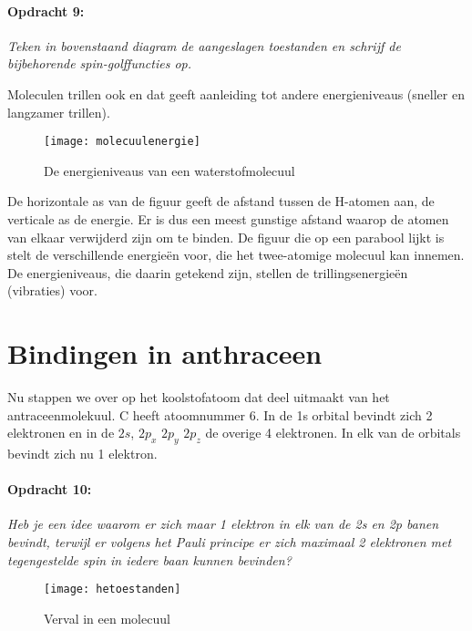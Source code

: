 \paragraph*{Opdracht 9:}

\emph{Teken in bovenstaand diagram de aangeslagen toestanden en schrijf
de bijbehorende spin-golffuncties op.}

Moleculen trillen ook en dat geeft aanleiding tot andere energieniveaus
(sneller en langzamer trillen).

\begin{figure}[h]
\noindent \begin{centering}
\texttt{[image: molecuulenergie]}
\par\end{centering}

\caption{De energieniveaus van een waterstofmolecuul}
\end{figure}


De horizontale as van de figuur geeft de afstand tussen de H-atomen
aan, de verticale as de energie. Er is dus een meest gunstige afstand
waarop de atomen van elkaar verwijderd zijn om te binden. De figuur
die op een parabool lijkt is stelt de verschillende energieën voor,
die het twee-atomige molecuul kan innemen. De energieniveaus, die
daarin getekend zijn, stellen de trillingsenergieën (vibraties) voor.


\section{Bindingen in anthraceen}

Nu stappen we over op het koolstofatoom dat deel uitmaakt van het
antraceenmolekuul. C heeft atoomnummer 6. In de 1s orbital bevindt
zich 2 elektronen en in de $2s$, $2p_{x}$ $2p_{y}$ $2p_{z}$ de
overige 4 elektronen. In elk van de orbitals bevindt zich nu 1 elektron.


\paragraph*{Opdracht 10:}

\emph{Heb je een idee waarom er zich maar 1 elektron in elk van de
2s en 2p banen bevindt, terwijl er volgens het Pauli principe er zich
maximaal 2 elektronen met tegengestelde spin in iedere baan kunnen
bevinden?}

\begin{figure}[h]
\noindent \begin{centering}
\texttt{[image: hetoestanden]}
\par\end{centering}

\caption{\label{fig:Verval-in-He}Verval in een molecuul}
\end{figure}


